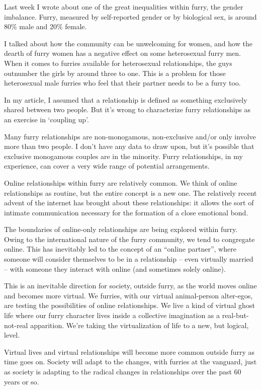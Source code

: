 
Last week I wrote about one of the great inequalities within furry, the gender imbalance. Furry, measured by self-reported gender or by biological sex, is around 80\% male and 20\% female.

I talked about how the community can be unwelcoming for women, and how the dearth of furry women has a negative effect on some heterosexual furry men. When it comes to furries available for heterosexual relationships, the guys outnumber the girls by around three to one. This is a problem for those heterosexual male furries who feel that their partner needs to be a furry too.

In my article, I assumed that a relationship is defined as something exclusively shared between two people. But it's wrong to characterize furry relationships as an exercise in `coupling up'.

Many furry relationships are non-monogamous, non-exclusive and/or only involve more than two people. I don't have any data to draw upon, but it's possible that exclusive monogamous couples are in the minority. Furry relationships, in my experience, can cover a very wide range of potential arrangements.

Online relationships within furry are relatively common. We think of online relationships as routine, but the entire concept is a new one. The relatively recent advent of the internet has brought about these relationships: it allows the sort of intimate communication necessary for the formation of a close emotional bond.

The boundaries of online-only relationships are being explored within furry. Owing to the international nature of the furry community, we tend to congregate online. This has inevitably led to the concept of an ``online partner'', where someone will consider themselves to be in a relationship -- even virtually married -- with someone they interact with online (and sometimes solely online).

This is an inevitable direction for society, outside furry, as the world moves online and becomes more virtual. We furries, with our virtual animal-person alter-egos, are testing the possibilities of online relationships. We live a kind of virtual ghost life where our furry character lives inside a collective imagination as a real-but-not-real apparition. We're taking the virtualization of life to a new, but logical, level.

Virtual lives and virtual relationships will become more common outside furry as time goes on. Society will adapt to the changes, with furries at the vanguard, just as society is adapting to the radical changes in relationships over the past 60 years or so.


